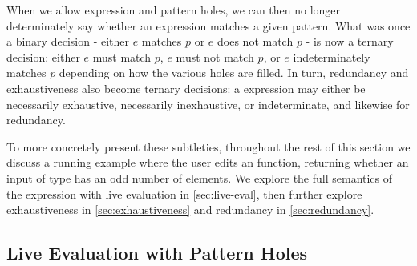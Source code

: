 When we allow expression and pattern holes, we can then no longer determinately say whether an expression matches a given pattern. What was once a binary decision - either $e$ matches $p$ or $e$ does not match $p$ - is now a ternary decision: either $e$ must match $p$, $e$ must not match $p$, or $e$ indeterminately matches $p$ depending on how the various holes are filled. In turn, redundancy and exhaustiveness also become ternary decisions: a  expression may either be necessarily exhaustive, necessarily inexhaustive, or indeterminate, and likewise for redundancy. 

To more concretely present these subtleties, throughout the rest of this section we discuss a running example where the user edits an  function, returning whether an input of type \li{[Int]} has an odd number of elements. We explore the full semantics of the  expression with live evaluation in \autoref{sec:live-eval}, then further explore exhaustiveness in \autoref{sec:exhaustiveness} and redundancy in \autoref{sec:redundancy}.

\subsection{Live Evaluation with Pattern Holes}\label{sec:live-eval}

